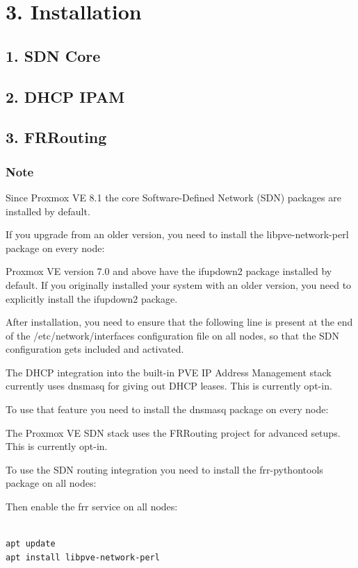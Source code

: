 \section{3. Installation}

\subsection{1. SDN Core}

\subsection{2. DHCP IPAM}

\subsection{3. FRRouting}

\subsubsection{Note}

Since Proxmox VE 8.1 the core Software-Defined Network (SDN) packages are installed by default.

If you upgrade from an older version, you need to install the libpve-network-perl package on every node:

Proxmox VE version 7.0 and above have the ifupdown2 package installed by default. If you originally installed your system with an older version, you need to explicitly install the ifupdown2 package.

After installation, you need to ensure that the following line is present at the end of the /etc/network/interfaces configuration file on all nodes, so that the SDN configuration gets included and activated.

The DHCP integration into the built-in PVE IP Address Management stack currently uses dnsmasq for giving out DHCP leases. This is currently opt-in.

To use that feature you need to install the dnsmasq package on every node:

The Proxmox VE SDN stack uses the FRRouting project for advanced setups. This is currently opt-in.

To use the SDN routing integration you need to install the frr-pythontools package on all nodes:

Then enable the frr service on all nodes:

\begin{lstlisting}

apt update
apt install libpve-network-perl

\end{lstlisting}

